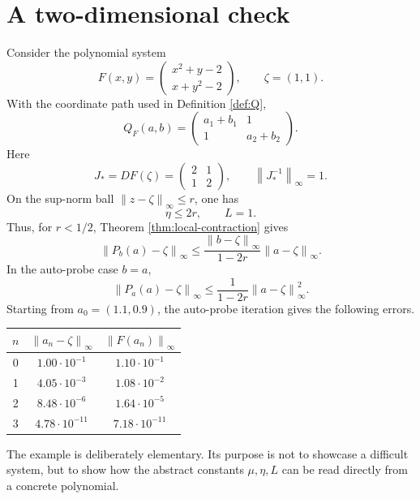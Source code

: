 \documentclass[11pt]{article}
\theoremstyle{definition}
\theoremstyle{remark}
\newcommand{\norm}[1]{\left\lVert #1\right\rVert}
\newcommand{\zetaRoot}{\zeta}
\begin{document}
\section{A two-dimensional check}

Consider the polynomial system
\begin{equation}\label{eq:example}
        F(x,y)=
        \begin{pmatrix}
        x^2+y-2\\
        x+y^2-2
        \end{pmatrix},
        \qquad \zetaRoot=(1,1).
\end{equation}
With the coordinate path used in Definition \ref{def:Q},
\[
        Q_F(a,b)=
        \begin{pmatrix}
        a_1+b_1 & 1\\
        1 & a_2+b_2
        \end{pmatrix}.
\]
Here
\[
        J_*=DF(\zetaRoot)=
        \begin{pmatrix}2&1\\1&2\end{pmatrix},
        \qquad \norm{J_*^{-1}}_\infty=1.
\]
On the sup-norm ball $\norm{z-\zetaRoot}_\infty\leq r$, one has
\[
        \eta\leq 2r,
        \qquad L=1.
\]
Thus, for $r<1/2$, Theorem \ref{thm:local-contraction} gives
\[
        \norm{P_b(a)-\zetaRoot}_\infty
        \leq
        \frac{\norm{b-\zetaRoot}_\infty}{1-2r}
        \norm{a-\zetaRoot}_\infty.
\]
In the auto-probe case $b=a$,
\[
        \norm{P_a(a)-\zetaRoot}_\infty
        \leq
        \frac{1}{1-2r}
        \norm{a-\zetaRoot}_\infty^2.
\]
Starting from $a_0=(1.1,0.9)$, the auto-probe iteration gives the following errors.

\begin{center}
\begin{tabular}{@{}ccc@{}}
\toprule
$n$ & $\norm{a_n-\zetaRoot}_\infty$ & $\norm{F(a_n)}_\infty$\\
\midrule
0 & $1.00\cdot 10^{-1}$ & $1.10\cdot 10^{-1}$\\
1 & $4.05\cdot 10^{-3}$ & $1.08\cdot 10^{-2}$\\
2 & $8.48\cdot 10^{-6}$ & $1.64\cdot 10^{-5}$\\
3 & $4.78\cdot 10^{-11}$ & $7.18\cdot 10^{-11}$\\
\bottomrule
\end{tabular}
\end{center}

The example is deliberately elementary.  Its purpose is not to showcase a difficult system, but to show how the abstract constants $\mu,\eta,L$ can be read directly from a concrete polynomial.
\end{document}
